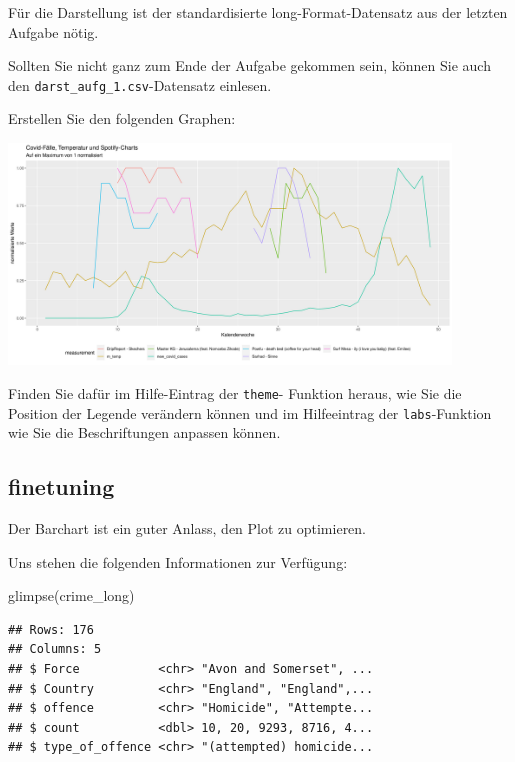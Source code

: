 \documentclass[
]{book}
\newenvironment{Shaded}{\begin{snugshade}}{\end{snugshade}}
\newcommand{\FunctionTok}[1]{\textcolor[rgb]{0.00,0.00,0.00}{#1}}
\newcommand{\NormalTok}[1]{#1}
\begin{document}
Für die Darstellung ist der standardisierte long-Format-Datensatz aus der letzten Aufgabe nötig.

Sollten Sie nicht ganz zum Ende der Aufgabe gekommen sein, können Sie auch den \texttt{darst\_aufg\_1.csv}-Datensatz einlesen.

Erstellen Sie den folgenden Graphen:

\begin{center}\includegraphics[width=333.333333333333pt]{imgs/task_ts} \end{center}

Finden Sie dafür im Hilfe-Eintrag der \texttt{theme}- Funktion heraus, wie Sie die Position der Legende verändern können und im Hilfeeintrag der \texttt{labs}-Funktion wie Sie die Beschriftungen anpassen können.

\hypertarget{finetuning}{%
\subsection{finetuning}\label{finetuning}}

Der Barchart ist ein guter Anlass, den Plot zu optimieren.

Uns stehen die folgenden Informationen zur Verfügung:

\begin{Shaded}
\begin{Highlighting}[]
\FunctionTok{glimpse}\NormalTok{(crime\_long)}
\end{Highlighting}
\end{Shaded}

\begin{verbatim}
## Rows: 176
## Columns: 5
## $ Force           <chr> "Avon and Somerset", ...
## $ Country         <chr> "England", "England",...
## $ offence         <chr> "Homicide", "Attempte...
## $ count           <dbl> 10, 20, 9293, 8716, 4...
## $ type_of_offence <chr> "(attempted) homicide...
\end{verbatim}
\end{document}
